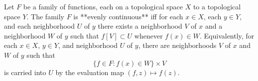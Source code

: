 Let $F$ be a family of functions, each on a topological space $X$ to a topological space $Y$. The family $F$ is **evenly continuous** iff for each $x \in X$, each $y \in Y$, and each neighborhood $U$ of $y$ there exists a neighborhood $V$ of $x$ and a neighborhood $W$ of $y$ such that $f[V] \subset U$ whenever $f(x) \in W$. Equivalently, for each $x \in X$, $y \in Y$, and neighborhood $U$ of $y$, there are neighborhoods $V$ of $x$ and $W$ of $y$ such that
$$\{f \in F : f(x) \in W\} \times V$$
is carried into $U$ by the evaluation map $(f, z) \mapsto f(z)$.
